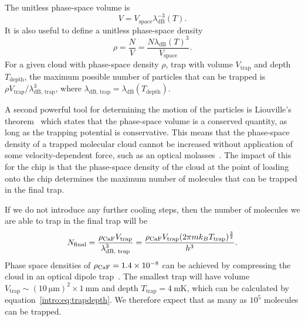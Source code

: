 The unitless phase-space volume is
%
\begin{equation}
  V = V_\text{space} \lambda_\text{dB}^{-3}(T).
\end{equation}
%
It is also useful to define a unitless phase-space
density~\cite{PhysRevA.52.1423}
%
\begin{equation}
  \rho = \frac{N}{V} = \frac{N \lambda_\text{dB}(T)^3}{V_\text{space}}.
\end{equation}
%
For a given cloud with phase-space density $\rho$, trap with volume
$V_\text{trap}$ and depth $T_\text{depth}$,
the maximum possible number of particles that can be trapped is $\rho
V_\text{trap}/\lambda_\text{dB, trap}^3$, where $\lambda_\text{dB, trap} =
\lambda_\text{dB}(T_\text{depth})$.

A second powerful tool for determining the motion of the particles is
Liouville's theorem~\cite{Landau1982, Hand1998} which states that the phase-space
volume is a conserved quantity, as long as the trapping potential is
conservative. This means that the phase-space density of a trapped molecular
cloud cannot be increased without application of some velocity-dependent
force, such as an optical molasses~\cite{Metcalf1999}. The impact of this for
the chip is that the phase-space density of the cloud at the point of loading
onto the chip determines the maximum number of molecules that can be trapped in
the final trap.

If we do not introduce any further cooling steps, then the number of molecules
we are able to trap in the final trap will be
%
\begin{equation}
  N_\text{final} = \frac{\rho_\text{CaF{}}V_\text{trap}}
  {\lambda_\text{dB, trap}^3} = \frac{\rho_\text{CaF{}} V_\text{trap}(2 \pi m k_B
  T_\text{trap})^\frac{3}{2}}{h^3}.
  \label{sim:eq:psd_N}
\end{equation}
%
Phase space densities of $\rho_\text{CaF{}} = 1.4\times10^{-8}$ can be
achieved by compressing the cloud in an optical dipole trap~\cite{PhysRevLett.121.083201}. The
smallest trap will have volume
$V_\text{trap}\sim(\SI{10}{\micro\meter})^2\times\SI{1}{\milli\meter}$ and
depth
$T_\text{trap}=\SI{4}{\milli\kelvin}$, which can be calculated by
equation~\ref{intro:eq:trapdepth}.
%
%
We therefore expect that as many as $10^5$ molecules can be trapped.


